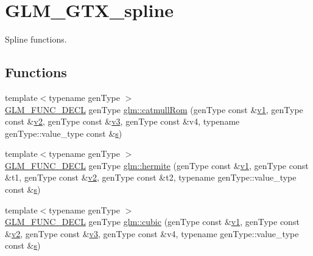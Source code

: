 \hypertarget{group__gtx__spline}{}\section{G\+L\+M\+\_\+\+G\+T\+X\+\_\+spline}
\label{group__gtx__spline}


Spline functions.  


\subsection*{Functions}
\begin{DoxyCompactItemize}
\item 
{\footnotesize template$<$typename gen\+Type $>$ }\\\mbox{\hyperlink{setup_8hpp_ab2d052de21a70539923e9bcbf6e83a51}{G\+L\+M\+\_\+\+F\+U\+N\+C\+\_\+\+D\+E\+CL}} gen\+Type \mbox{\hyperlink{group__gtx__spline_ga8119c04f8210fd0d292757565cd6918d}{glm\+::catmull\+Rom}} (gen\+Type const \&\mbox{\hyperlink{glad_8h_a0779c3b73f9aa3a0ac5b0139b5d291d9}{v1}}, gen\+Type const \&\mbox{\hyperlink{glad_8h_a9a09a1837922b2b806f4589096a52049}{v2}}, gen\+Type const \&\mbox{\hyperlink{glad_8h_acc806b31cbf466ceba6555983d8b814d}{v3}}, gen\+Type const \&v4, typename gen\+Type\+::value\+\_\+type const \&\mbox{\hyperlink{glad_8h_af1b1d5edfea6a34daee7389b1b5810ad}{s}})
\item 
{\footnotesize template$<$typename gen\+Type $>$ }\\\mbox{\hyperlink{setup_8hpp_ab2d052de21a70539923e9bcbf6e83a51}{G\+L\+M\+\_\+\+F\+U\+N\+C\+\_\+\+D\+E\+CL}} gen\+Type \mbox{\hyperlink{group__gtx__spline_gaa69e143f6374d32f934a8edeaa50bac9}{glm\+::hermite}} (gen\+Type const \&\mbox{\hyperlink{glad_8h_a0779c3b73f9aa3a0ac5b0139b5d291d9}{v1}}, gen\+Type const \&t1, gen\+Type const \&\mbox{\hyperlink{glad_8h_a9a09a1837922b2b806f4589096a52049}{v2}}, gen\+Type const \&t2, typename gen\+Type\+::value\+\_\+type const \&\mbox{\hyperlink{glad_8h_af1b1d5edfea6a34daee7389b1b5810ad}{s}})
\item 
{\footnotesize template$<$typename gen\+Type $>$ }\\\mbox{\hyperlink{setup_8hpp_ab2d052de21a70539923e9bcbf6e83a51}{G\+L\+M\+\_\+\+F\+U\+N\+C\+\_\+\+D\+E\+CL}} gen\+Type \mbox{\hyperlink{group__gtx__spline_ga6b867eb52e2fc933d2e0bf26aabc9a70}{glm\+::cubic}} (gen\+Type const \&\mbox{\hyperlink{glad_8h_a0779c3b73f9aa3a0ac5b0139b5d291d9}{v1}}, gen\+Type const \&\mbox{\hyperlink{glad_8h_a9a09a1837922b2b806f4589096a52049}{v2}}, gen\+Type const \&\mbox{\hyperlink{glad_8h_acc806b31cbf466ceba6555983d8b814d}{v3}}, gen\+Type const \&v4, typename gen\+Type\+::value\+\_\+type const \&\mbox{\hyperlink{glad_8h_af1b1d5edfea6a34daee7389b1b5810ad}{s}})
\end{DoxyCompactItemize}



